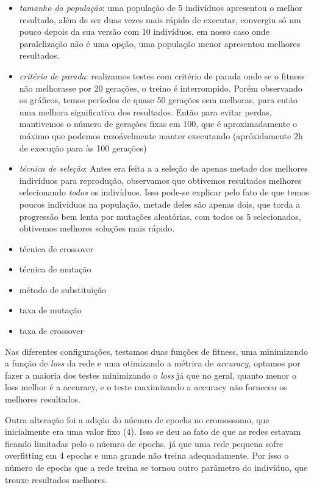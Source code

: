 \documentclass[twoside,conference,a4paper]{IEEEtran}
\begin{document}
\begin{itemize}
    \item \emph{tamanho da população}: uma população de 5 indivíduos apresentou o melhor resultado, além de ser duas vezes mais rápido de executar, convergiu só um pouco depois da sua versão com 10 indivíduos, em nosso caso onde paralelização não é uma opção, uma população menor apresentou melhores resultados.
    \item \emph{critério de parada}: realizamos testes com critério de parada onde se o fitness não melhorasse por 20 gerações, o treino é interrompido. Porém observando os gráficos, temos períodos de quase 50 gerações sem melhoras, para então uma melhora significativa dos resultados. Então para evitar perdas, mantivemos o número de gerações fixas em 100, que é aproximadamente o máximo que podemos razoávelmente manter executando (apróxidamente 2h de execução para às 100 gerações)
    \item \emph{técnica de seleção}: Antes era feita a a seleção de apenas metade dos melhores indivíduos para reprodução, observamos que obtivemos resultados melhores selecionando \emph{todos} os indivíduos. Isso pode-se explicar pelo fato de que temos poucos indivíduos na população, metade deles são apenas dois, que torda a progressão bem lenta por mutações aleatórias, com todos os 5 selecionados, obtivemos melhores soluções mais rápido.
    \item técnica de crossover
    \item técnica de mutação
    \item método de substituição
    \item taxa de mutação
    \item taxa de crossover
\end{itemize}

Nas diferentes configurações, testamos duas funções de fitness, uma minimizando a função de \emph{loss} da rede e uma otimizando a métrica de \emph{accuracy}, optamos por fazer a maioria dos testes minimizando o \emph{loss} já que no geral, quanto menor o loss melhor é a accuracy, e o teste maximizando a accuracy não forneceu os melhores resultados.

Outra alteração foi a adição do núemro de epochs no cromossomo, que inicialmente era uma valor fixo (4). Isso se deu ao fato de que as redes estavam ficando limitadas pelo o núemro de epochs, já que uma rede pequena sofre overfitting em 4 epochs e uma grande não treina adequadamente. Por isso o número de epochs que a rede treina se tornou outro parâmetro do indivíduo, que trouxe resultados melhores. \\
\end{document}
